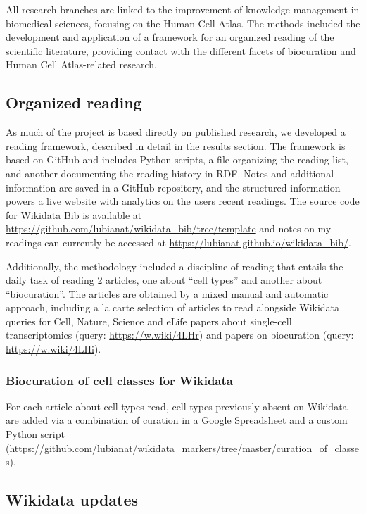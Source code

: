 All research branches are linked to the improvement of knowledge management in biomedical sciences, focusing on the Human Cell Atlas.
The methods included the development and application of a framework for an organized reading of the scientific literature, providing contact with the different facets of biocuration and Human Cell Atlas-related research.

\hypertarget{organized-reading}{%
\subsection{Organized reading}\label{organized-reading}}

As much of the project is based directly on published research, we developed a reading framework, described in detail in the results section.
The framework is based on GitHub and includes Python scripts, a file organizing the reading list, and another documenting the reading history in RDF.
Notes and additional information are saved in a GitHub repository, and the structured information powers a live website with analytics on the users recent readings.
The source code for Wikidata Bib is available at \url{https://github.com/lubianat/wikidata_bib/tree/template} and notes on my readings can currently be accessed at \url{https://lubianat.github.io/wikidata_bib/}.

Additionally, the methodology included a discipline of reading that entails the daily task of reading 2 articles, one about ``cell types'' and another about ``biocuration''.
The articles are obtained by a mixed manual and automatic approach, including a la carte selection of articles to read alongside Wikidata queries for Cell, Nature, Science and eLife papers about single-cell transcriptomics (query: \url{https://w.wiki/4LHr}) and papers on biocuration (query: \url{https://w.wiki/4LHi}).

\hypertarget{biocuration-of-cell-classes-for-wikidata}{%
\subsubsection{Biocuration of cell classes for Wikidata}\label{biocuration-of-cell-classes-for-wikidata}}

For each article about cell types read, cell types previously absent on Wikidata are added via a combination of curation in a Google Spreadsheet and a custom Python script (https://github.com/lubianat/wikidata\_markers/tree/master/curation\_of\_classes).

\hypertarget{wikidata-updates}{%
\subsection{Wikidata updates}\label{wikidata-updates}}

